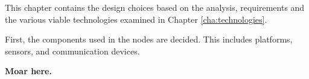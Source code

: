 \label{cha:designintro}

This chapter contains the design choices based on the analysis, requirements and the various viable technologies examined in Chapter \ref{cha:technologies}.

First, the components used in the nodes are decided. This includes platforms, sensors, and communication devices.

\textbf{Moar here.}\\





